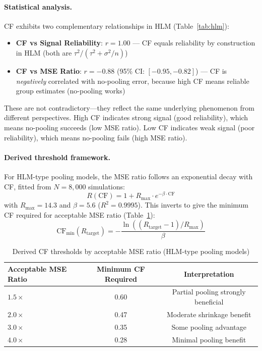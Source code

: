 \documentclass[10pt]{article} %
\theoremstyle{plain}
\theoremstyle{definition}
\begin{document}
\paragraph{Statistical analysis.} CF exhibits two complementary relationships in HLM (Table~\ref{tab:hlm}):

\begin{itemize}
    \item \textbf{CF vs Signal Reliability}: $r = 1.00$ --- CF equals reliability by construction in HLM (both are $\tau^2 / (\tau^2 + \sigma^2/n)$)
    \item \textbf{CF vs MSE Ratio}: $r = -0.88$ (95\% CI: $[-0.95, -0.82]$) --- CF is \emph{negatively} correlated with no-pooling error, because high CF means reliable group estimates (no-pooling works)
\end{itemize}

\noindent These are not contradictory---they reflect the same underlying phenomenon from different perspectives. High CF indicates strong signal (good reliability), which means no-pooling succeeds (low MSE ratio). Low CF indicates weak signal (poor reliability), which means no-pooling fails (high MSE ratio).

\paragraph{Derived threshold framework.} For HLM-type pooling models, the MSE ratio follows an exponential decay with CF, fitted from $N = 8{,}000$ simulations:
\begin{equation}
R(\text{CF}) = 1 + R_{\max} \cdot e^{-\beta \cdot \text{CF}}
\label{eq:hlm-threshold}
\end{equation}
with $R_{\max} = 14.3$ and $\beta = 5.6$ ($R^2 = 0.9995$). This inverts to give the minimum CF required for acceptable MSE ratio (Table~\ref{tab:hlm-thresholds}):
\begin{equation}
\text{CF}_{\min}(R_{\text{target}}) = -\frac{\ln((R_{\text{target}} - 1)/R_{\max})}{\beta}
\end{equation}

\begin{table}[!htbp]
\centering
\caption{Derived CF thresholds by acceptable MSE ratio (HLM-type pooling models)}
\label{tab:hlm-thresholds}
\begin{tabular}{lcc}
\toprule
Acceptable MSE Ratio & Minimum CF Required & Interpretation \\
\midrule
$1.5\times$ & 0.60 & Partial pooling strongly beneficial \\
$2.0\times$ & 0.47 & Moderate shrinkage benefit \\
$3.0\times$ & 0.35 & Some pooling advantage \\
$4.0\times$ & 0.28 & Minimal pooling benefit \\
\bottomrule
\end{tabular}
\end{table}
\end{document}
